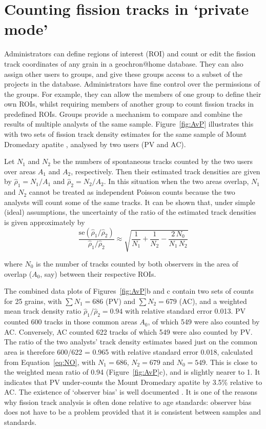\documentclass[gchron, manuscript]{copernicus}
\begin{document}
\section{Counting fission tracks in `private mode'}\label{sec:private}

Administrators can define regions of interest (ROI) and count or edit
the fission track coordinates of any grain in a geochron@home
database. They can also assign other users to groups, and give these
groups access to a subset of the projects in the
database. Administrators have fine control over the permissions of the
groups. For example, they can allow the members of one group to define
their own ROIs, whilst requiring members of another group to count
fission tracks in predefined ROIs.  Groups provide a mechanism to
compare and combine the results of multiple analysts of the same
sample. Figure~\ref{fig:AvP} illustrates this with two sets of fission
track density estimates for the same sample of Mount Dromedary apatite
\citep{green1985b}, analysed by two users (PV and AC).\medskip

Let $N_1$ and $N_2$ be the numbers of spontaneous tracks counted by
the two users over areas $A_1$ and $A_2$, respectively. Then their
estimated track densities are given by $\hat{\rho}_1 = N_1/A_1$ and
$\hat{\rho}_2 = N_2/A_2$. In this situation when the two areas
overlap, $N_1$ and $N_2$ cannot be treated as independent Poisson
counts because the two analysts will count some of the same tracks. It
can be shown that, under simple (ideal) assumptions, the uncertainty
of the ratio of the estimated track densities is given approximately
by
\begin{equation}
  \frac{\mbox{se}(\hat{\rho}_1/\hat{\rho}_2)}{\hat{\rho}_1/\hat{\rho}_2} \approx
  \sqrt{ \frac{1}{N_1} + \frac{1}{N_2} - \frac{2\,N_0}{N_1\,N_2} }
  \label{eq:NO}
\end{equation}

\noindent where $N_0$ is the number of tracks counted by both
observers in the area of overlap ($A_0$, say) between their respective
ROIs.\medskip 

The combined data plots of Figures~\ref{fig:AvP}b and c contain two
sets of counts for 25 grains, with $\sum N_{1} = 686$ (PV) and $\sum
N_{2} = 679$ (AC), and a weighted mean track density ratio
$\hat{\rho}_{1}/\hat{\rho}_{2} = 0.94$ with relative standard error
0.013. PV counted 600 tracks in those common areas $A_0$, of which 549
were also counted by AC. Conversely, AC counted 622 tracks of which
549 were also counted by PV. The ratio of the two analysts' track
density estimates based just on the common area is therefore 600/622 =
0.965 with relative standard error 0.018, calculated from
Equation~\ref{eq:NO}, with $N_1 = 686$, $N_2 = 679$ and $N_0 = 549$.
This is close to the weighted mean ratio of 0.94
(Figure~\ref{fig:AvP}c), and is slightly nearer to 1. It indicates
that PV under-counts the Mount Dromedary apatite by 3.5\% relative to
AC.  The existence of `observer bias' is well documented
\citep{tamer2025}.  It is one of the reasons why fission track
analysis is often done relative to age standards: observer bias does
not have to be a problem provided that it is consistent between
samples and standards.\medskip
\end{document}

